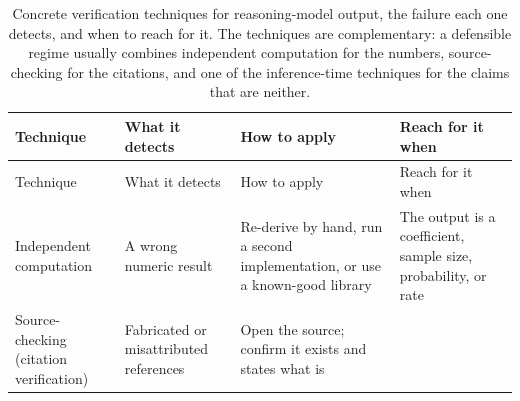 \documentclass[
  letterpaper,
  11pt]{scrbook}
\begin{document}
\begin{longtable}[]{@{}
  >{\raggedright\arraybackslash}p{}
  >{\raggedright\arraybackslash}p{}
  >{\raggedright\arraybackslash}p{}
  >{\raggedright\arraybackslash}p{}@{}}
\caption{Concrete verification techniques for reasoning-model output,
the failure each one detects, and when to reach for it. The techniques
are complementary: a defensible regime usually combines independent
computation for the numbers, source-checking for the citations, and one
of the inference-time techniques for the claims that are
neither.}\label{tbl-verification-techniques}\tabularnewline
\toprule\noalign{}
\begin{minipage}[b]{\linewidth}\raggedright
Technique
\end{minipage} & \begin{minipage}[b]{\linewidth}\raggedright
What it detects
\end{minipage} & \begin{minipage}[b]{\linewidth}\raggedright
How to apply
\end{minipage} & \begin{minipage}[b]{\linewidth}\raggedright
Reach for it when
\end{minipage} \\
\midrule\noalign{}
\endfirsthead
\toprule\noalign{}
\begin{minipage}[b]{\linewidth}\raggedright
Technique
\end{minipage} & \begin{minipage}[b]{\linewidth}\raggedright
What it detects
\end{minipage} & \begin{minipage}[b]{\linewidth}\raggedright
How to apply
\end{minipage} & \begin{minipage}[b]{\linewidth}\raggedright
Reach for it when
\end{minipage} \\
\midrule\noalign{}
\endhead
\bottomrule\noalign{}
\endlastfoot
Independent computation & A wrong numeric result & Re-derive by hand,
run a second implementation, or use a known-good library & The output is
a coefficient, sample size, probability, or rate \\
Source-checking (citation verification) & Fabricated or misattributed
references & Open the source; confirm it exists and states what is

\end{longtable}
\end{document}
